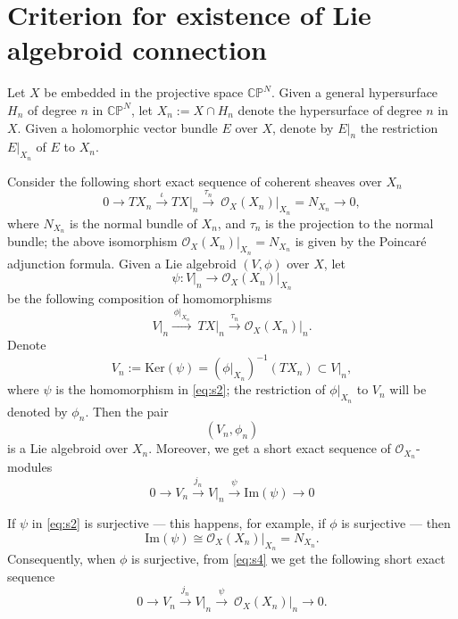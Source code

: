\documentclass[12pt,reqno]{amsart}
\numberwithin{equation}{section}
\theoremstyle{definition}
\begin{document}
\section{Criterion for existence of Lie algebroid connection}

Let $X$ be embedded in the projective space $\mathbb{CP}^N$. Given a general hypersurface $H_n$ of degree $n$ 
in $\mathbb{CP}^N$, let $X_n  :=  X \cap H_n $ denote the hypersurface of degree $n$ in $X$. Given a
holomorphic vector bundle $E$ over $X$, denote by $E\big\vert_n$ the restriction
$E\big\vert_{X_n}$ of $E$ to $X_n$.

Consider the following short exact sequence of coherent sheaves over $X_n$
\begin{equation}
\label{eq:s1}
0 \longrightarrow  TX_n  \xrightarrow{\,\iota \,} TX\big\vert_{n}  \xrightarrow{\, \tau_n
\, }\ \mathcal{O}_X(X_n)\big\vert_{X_n}  =  N_{X_n}  \longrightarrow   0,
\end{equation}
where $N_{X_n}$ is the normal bundle of $X_n$, and $\tau_n$ is the projection to the normal bundle;
the above isomorphism $\mathcal{O}_X(X_n)\big\vert_{X_n}  =  N_{X_n}$ is given by the Poincar\'e adjunction
formula. Given a Lie algebroid $(V, \phi)$ over $X$, let
\begin{equation}
\label{eq:s2}
\psi  :  V\big\vert_n   \longrightarrow  \mathcal{O}_X(X_n)\big\vert_{X_n}
\end{equation}
be the following composition of homomorphisms
$$
V\big\vert_n   \xrightarrow{\, \phi\big\vert_{X_n} \,}\ TX\big\vert_n  \xrightarrow{
\tau_n } \mathcal{O}_X(X_n)\big\vert_n.
$$
Denote 
\begin{equation}
\label{eq:s3}
V_n := \mathrm{Ker}(\psi)  =  (\phi\big\vert_{X_n})^{-1} (TX_n)  \subset V\big\vert_{n},
\end{equation}
where $\psi$ is the homomorphism in \eqref{eq:s2}; the restriction of $\phi\big\vert_{X_n}$ to
$V_n$ will be denoted by $\phi_n$. Then the pair 
\begin{equation}
\label{eq:V_n}
(V_n, \phi_n)
\end{equation}
is a Lie algebroid over $X_n$. Moreover, we get a short exact sequence of $\mathcal{O}_{X_n}$-modules
\begin{equation}
\label{eq:s4}
0  \longrightarrow  V_n  \xrightarrow{j_n}  V\big\vert_{n} \xrightarrow{
\psi } \mathrm{Im}(\psi) \longrightarrow  0
\end{equation}

If $\psi$ in \eqref{eq:s2} is surjective --- this happens, for example, if $\phi$ is surjective --- then 
$$
\mathrm{Im}(\psi) \cong  \mathcal{O}_X(X_n)\big\vert_{X_n} =  N_{X_n}.
$$
Consequently, when $\phi$ is surjective, from \eqref{eq:s4} we get the following short exact sequence
\begin{equation}\label{eq:s5}
0  \longrightarrow V_n  \xrightarrow{j_n}  V\big\vert_{n} \xrightarrow{\,
\psi\, }\ \mathcal{O}_X(X_n)\big\vert_{n} \longrightarrow  0.
\end{equation}
\end{document}
